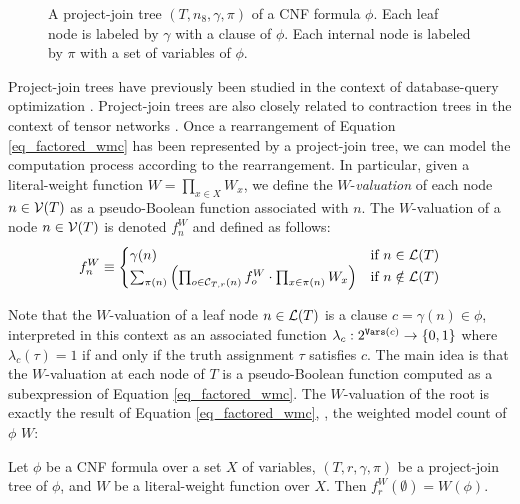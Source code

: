 \begin{figure}%
    \centering
\caption{
    A project-join tree $(T, n_{8}, \gamma, \pi)$ of a CNF formula $\phi$.
    Each leaf node is labeled by $\gamma$ with a clause of $\phi$.
    Each internal node is labeled by $\pi$ with a set of variables of $\phi$.
}
\label{fig_join_tree}
\end{figure}

Project-join trees have previously been studied in the context of database-query optimization \cite{MPPV04}.
Project-join trees are also closely related to contraction trees in the context of tensor networks \cite{EP14,DDV19}.
Once a rearrangement of Equation \eqref{eq_factored_wmc} has been represented by a project-join tree, we can model the computation process according to the rearrangement.
In particular, given a literal-weight function $W = \prod_{x \in X} W_x$, we define the $W$-\emph{valuation} of each node $n \in \mathcal{V}(T)$ as a pseudo-Boolean function associated with $n$.
The $W$-valuation of a node $n \in \mathcal{V}(T)$ is denoted $f^W_n$ and defined as follows:
\begin{equation}
\label{eq_valuation}
    f^W_n \equiv
    \begin{cases}
       \gamma(n) & \text{if}~n \in \mathcal{L}(T) \\
        \sum_{\pi(n)} \left(  \prod_{o \in \mathcal{C}_{T,r}(n)} f^W_o \cdot \prod_{x \in \pi(n)} W_x  \right) & \text{if}~n \notin \mathcal{L}(T)
    \end{cases}
\end{equation}

Note that the $W$-valuation of a leaf node $n \in \mathcal{L}(T)$ is a clause $c = \gamma(n) \in \phi$, interpreted in this context as an associated function $\lambda_c : 2^{\texttt{\upshape Vars}(c)} \to \left\{ 0, 1 \right\}$ where $\lambda_c(\tau) = 1$ if and only if the truth assignment $\tau$ satisfies $c$.
The main idea is that the $W$-valuation at each node of $T$ is a pseudo-Boolean function computed as a subexpression of Equation \eqref{eq_factored_wmc}.
The $W$-valuation of the root is exactly the result of Equation \eqref{eq_factored_wmc}, \ie, the weighted model count of $\phi$ \wrt{} $W$:
\begin{theorem}
\label{thm_valuation_wmc}
    Let $\phi$ be a CNF formula over a set $X$ of variables, $(T, r, \gamma, \pi)$ be a project-join tree of $\phi$, and $W$ be a literal-weight function over $X$.
    Then $f^W_r(\emptyset) = W(\phi)$.
\end{theorem}

